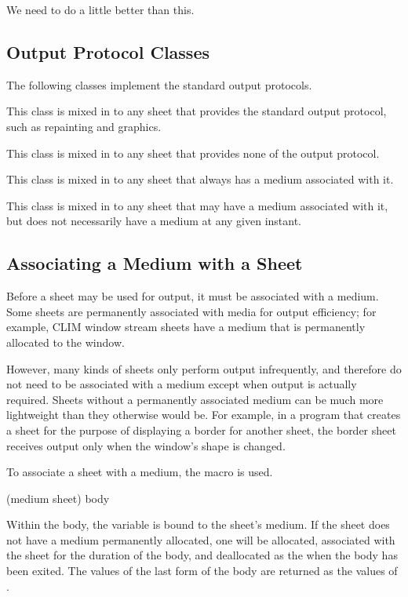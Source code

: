  {We need to do a little better than this.}


\subsection {Output Protocol Classes}

The following classes implement the standard output protocols.


This class is mixed in to any sheet that provides the standard output protocol,
such as repainting and graphics.


This class is mixed in to any sheet that provides none of the output protocol.


This class is mixed in to any sheet that always has a medium associated with it.


This class is mixed in to any sheet that may have a medium associated with it,
but does not necessarily have a medium at any given instant.


\subsection {Associating a Medium with a Sheet}

Before a sheet may be used for output, it must be associated with a medium.
Some sheets are permanently associated with media for output efficiency; for
example, CLIM window stream sheets have a medium that is permanently allocated
to the window.

However, many kinds of sheets only perform output infrequently, and therefore do
not need to be associated with a medium except when output is actually required.
Sheets without a permanently associated medium can be much more lightweight than
they otherwise would be.  For example, in a program that creates a sheet for the
purpose of displaying a border for another sheet, the border sheet receives
output only when the window's shape is changed.

To associate a sheet with a medium, the macro  is used.

 {(medium sheet) \body body}

Within the body, the variable  is bound to the sheet's medium.  If
the sheet does not have a medium permanently allocated, one will be allocated,
associated with the sheet for the duration of the body, and deallocated as the
when the body has been exited.  The values of the last form of the body are
returned as the values of .

